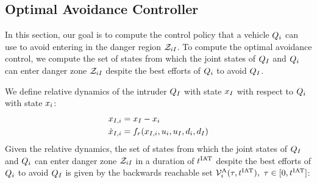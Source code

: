 \subsection{Optimal Avoidance Controller} \label{sec:intruder_avoid}
In this section, our goal is to compute the control policy that a vehicle $Q_i$ can use to avoid entering in the danger region $\mathcal{Z}_{iI}$. To compute the optimal avoidance control, we compute the set of states from which the joint states of $Q_{I}$ and $Q_i$ can enter danger zone $\mathcal{Z}_{iI}$ despite the best efforts of $Q_i$ to avoid $Q_{I}$. 

We define relative dynamics of the intruder $Q_{I}$ with state $x_I$ with respect to $Q_i$ with state $x_i$:
\begin{equation}
\label{eq:reldyn}
\begin{aligned}
\state_{\intr, i} &= \state_\intr - \state_i \\
\dot \state_{\intr, i} &= f_r(\state_{\intr, i}, \ctrl_i, \ctrl_\intr, \dstb_i, \dstb_\intr)
\end{aligned}
\end{equation}
Given the relative dynamics, the set of states from which the joint states of $Q_{I}$ and $Q_{i}$ can enter danger zone $\mathcal{Z}_{iI}$ in a duration of $t^\text{IAT}$ despite the best efforts of $Q_i$ to avoid $Q_{I}$ is given by the backwards reachable set $\mathcal{V}^{\text{A}}_i(\tau, t^\text{IAT}),~ \tau \in [0, t^\text{IAT}]$:

